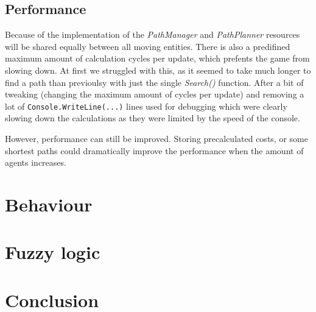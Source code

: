 \documentclass[11pt]{article}
\begin{document}
    
    \subsection{Performance}\label{subsec:pathperformance}
    Because of the implementation of the \textit{PathManager} and \textit{PathPlanner} resources will be shared equally between all moving entities.
    There is also a predifined maximum amount of calculation cycles per update, which prefents the game from slowing down.
    At first we struggled with this, as it seemed to take much longer to find a path than previoulsy with just the single \textit{Search()} function.
    After a bit of tweaking (changing the maximum amount of cycles per update) and removing a lot of \lstinline[columns=fixed]{Console.WriteLine(...)}
    lines used for debugging which were clearly slowing down the calculations as they were limited by the speed of the console.\par
    
    However, performance can still be improved.
    Storing precalculated costs, or some shortest paths could dramatically improve the performance when the amount of agents increases.
    
    \newpage
    \section{Behaviour}\label{sec:behaviour}
    
    \newpage
    \section{Fuzzy logic}\label{sec:fuzzyLogic}

    \newpage
    \section{Conclusion}\label{sec:conclusion}

    \newpage

    
    
\end{document}
